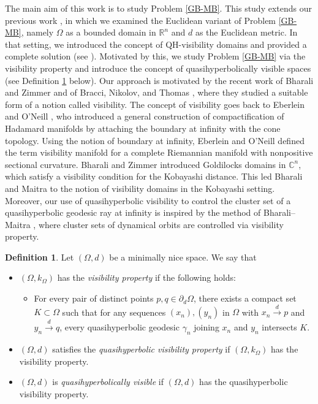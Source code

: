 \documentclass[a4paper,12pt]{amsart}
\theoremstyle{definition}
\newtheorem{defn}{Definition}[section]
\begin{document}
The main aim of this work is to study Problem \ref{GB-MB}. This study extends our previous work \cite{Allu-2023}, in which we examined the Euclidean variant of Problem \ref{GB-MB}, namely $\Omega$ as a bounded domain in $\mathbb{R}^n$ and $d$ as the Euclidean metric. In that setting, we introduced the concept of QH-visibility domains and provided a complete solution (see \cite[Theorems 2.2 and 2.3]{Allu-2023}). Motivated by this, we study Problem \ref{GB-MB} via the visibility property and introduce the concept of quasihyperbolically visible spaces (see Definition \ref{qh visible} below). Our approach is motivated by the recent work of Bharali and Zimmer \cite{Bharali-2017} and of Bracci, Nikolov, and Thomas \cite{Bracci-2022}, where they studied a suitable form of a notion called visibility. The concept of visibility goes back to Eberlein and O'Neill \cite{O'Neill-1973}, who introduced a general construction of compactification of Hadamard manifolds by attaching the boundary at infinity with the cone topology. Using the notion of boundary at infinity, Eberlein and O'Neill defined the term visibility manifold for a complete Riemannian manifold with nonpositive sectional curvature. Bharali and Zimmer \cite{Bharali-2017} introduced Goldilocks domains in $\mathbb{C}^n$, which satisfy a visibility condition for the Kobayashi distance. This led Bharali and Maitra \cite{Bharali-2021} to the notion of visibility domains in the Kobayashi setting. Moreover, our use of quasihyperbolic visibility to control the cluster set of a quasihyperbolic geodesic ray at infinity is inspired by the method of Bharali--Maitra \cite{Bharali-2021}, where cluster sets of dynamical orbits are controlled via visibility property.

\begin{defn}\label{qh visible}
	Let $(\Omega,d)$ be a minimally nice space. We say that
	\begin{itemize}
		\item[(1)] $(\Omega,k_{\Omega})$ has the {\it visibility property} if the following holds:
		\begin{itemize}
			\item[($*$)] For every pair of distinct points $p, q\in \partial_d\Omega$, there exists a compact set $K\subset\Omega$ such that for any sequences $(x_n), (y_n)$ in $\Omega$ with $x_n\stackrel{d}{\to} p$ and $y_n\stackrel{d}{\to} q$, every quasihyperbolic geodesic $\gamma_{n}$ joining $x_n$ and $y_n$ intersects $K$.
		\end{itemize}
		\item[(2)] $(\Omega,d)$ satisfies the {\it quasihyperbolic visibility property} if $(\Omega,k_{\Omega})$ has the visibility property.
		\item[(3)] $(\Omega,d)$ is {\it quasihyperbolically visible} if $(\Omega,d)$ has the quasihyperbolic visibility property.
	\end{itemize}
\end{defn}
\end{document}
